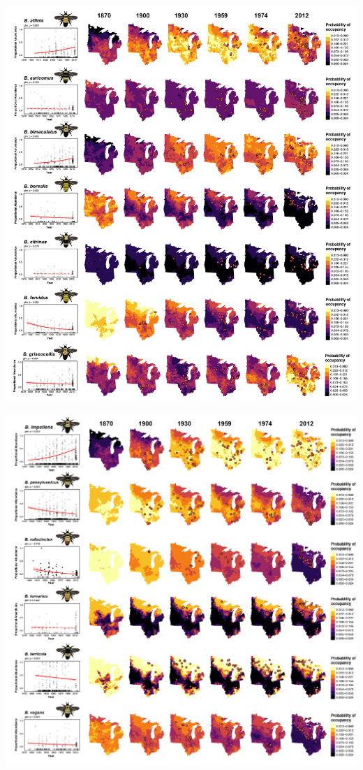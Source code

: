 \documentclass[11pt,]{article}
\begin{document}
\clearpage

\newpage

\includegraphics[width=1\textwidth,height=\textheight]{../ms_figs/fig4a.png}

\clearpage

\newpage

\includegraphics[width=1\textwidth,height=\textheight]{../ms_figs/fig4b.png}
\end{document}
